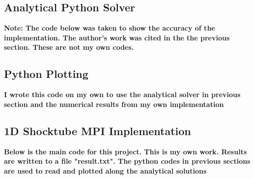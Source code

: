 \documentclass[12pt]{article}
\begin{document}
    \subsection{Analytical Python Solver}
    \textbf{Note: The code below was taken to show the accuracy of the implementation. The author's work was cited in the the previous section.  These are not my own codes.}

    

    \newpage
    \subsection{Python Plotting}
    \textbf{I wrote this code on my own to use the analytical solver in previous section and the numerical results from my own implementation}

    

    \newpage
    \subsection{1D Shocktube MPI Implementation}
    \textbf{Below is the main code for this project. This is my own work. Results are written to a file "result.txt". The python codes in previous sections are used to read and plotted along the analytical solutions}



    



    
    
\end{document}

